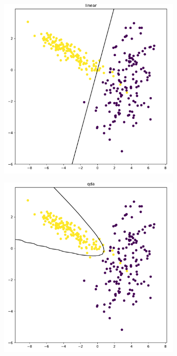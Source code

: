 \documentclass[9pt, oneside]{amsart}   	%
\begin{document}
\begin{figure}[t!]
\begin{subfigure}{.45\textwidth}
\end{subfigure}
\\[+5pt]
\begin{subfigure}{.45\textwidth}
  \centering
  \includegraphics[width=\linewidth]{classificationB_linear.pdf}
\end{subfigure} \hspace{5pt}
\begin{subfigure}{.45\textwidth}
  \centering
  \includegraphics[width=\linewidth]{classificationB_qda.pdf}
\end{subfigure}
\end{figure}
\end{document}
